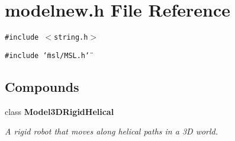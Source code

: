 \section{modelnew.h File Reference}
\label{modelnew_8h}
{\tt \#include $<$string.h$>$}\par
{\tt \#include \char`\"{}msl/MSL.h\char`\"{}}\par
\subsection*{Compounds}
\begin{CompactItemize}
\item 
class {\bf Model3DRigid\-Helical}
\begin{CompactList}\small\item\em A rigid robot that moves along helical paths in a 3D world.\item\end{CompactList}\end{CompactItemize}
